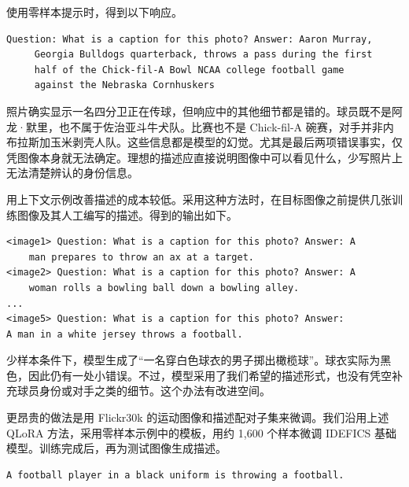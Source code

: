 使用零样本提示时，得到以下响应。

\noindent\begin{minipage}{\linewidth}
\begin{lstlisting}[caption={运动照片描述的零样本输出。},label={lst:ch09-caption-zero}]
Question: What is a caption for this photo? Answer: Aaron Murray,
     Georgia Bulldogs quarterback, throws a pass during the first
     half of the Chick-fil-A Bowl NCAA college football game
     against the Nebraska Cornhuskers
\end{lstlisting}
\end{minipage}\par

照片确实显示一名四分卫正在传球，但响应中的其他细节都是错的。球员既不是阿龙·默里，也不属于佐治亚斗牛犬队。比赛也不是 Chick-fil-A 碗赛，对手并非内布拉斯加玉米剥壳人队。这些信息都是模型的幻觉。尤其是最后两项错误事实，仅凭图像本身就无法确定。理想的描述应直接说明图像中可以看见什么，少写照片上无法清楚辨认的身份信息。

用上下文示例改善描述的成本较低。采用这种方法时，在目标图像之前提供几张训练图像及其人工编写的描述。得到的输出如下。

\noindent\begin{minipage}{\linewidth}
\begin{lstlisting}[caption={运动照片描述的上下文提示。},label={lst:ch09-caption-icl}]
<image1> Question: What is a caption for this photo? Answer: A
    man prepares to throw an ax at a target.
<image2> Question: What is a caption for this photo? Answer: A
    woman rolls a bowling ball down a bowling alley.
...
<image5> Question: What is a caption for this photo? Answer:
A man in a white jersey throws a football.
\end{lstlisting}
\end{minipage}\par

少样本条件下，模型生成了“一名穿白色球衣的男子掷出橄榄球”。球衣实际为黑色，因此仍有一处小错误。不过，模型采用了我们希望的描述形式，也没有凭空补充球员身份或对手之类的细节。这个办法有改进空间。

更昂贵的做法是用 Flickr30k 的运动图像和描述配对子集来微调。我们沿用上述 QLoRA 方法，采用零样本示例中的模板，用约 1,600 个样本微调 IDEFICS 基础模型。训练完成后，再为测试图像生成描述。

\noindent\begin{minipage}{\linewidth}
\begin{lstlisting}[caption={微调后的运动照片描述输出。},label={lst:ch09-caption-tuned}]
A football player in a black uniform is throwing a football.
\end{lstlisting}
\end{minipage}\par

